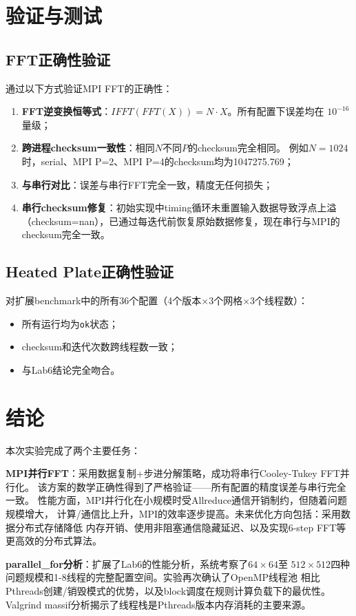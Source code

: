 \documentclass[UTF8,a4paper,12pt,fontset=none]{ctexart}
\begin{document}
\section{验证与测试}

\subsection{FFT正确性验证}

通过以下方式验证MPI FFT的正确性：

\begin{enumerate}[leftmargin=2.2em]
  \item \textbf{FFT逆变换恒等式}：$IFFT(FFT(X)) = N \cdot X$。所有配置下误差均在
    $10^{-16}$量级；
  \item \textbf{跨进程checksum一致性}：相同$N$不同$P$的checksum完全相同。
    例如$N=1024$时，serial、MPI P=2、MPI P=4的checksum均为1047275.769；
  \item \textbf{与串行对比}：误差与串行FFT完全一致，精度无任何损失；
  \item \textbf{串行checksum修复}：初始实现中timing循环未重置输入数据导致浮点上溢
    （checksum=nan），已通过每迭代前恢复原始数据修复，现在串行与MPI的checksum完全一致。
\end{enumerate}

\subsection{Heated Plate正确性验证}

对扩展benchmark中的所有36个配置（4个版本×3个网格×3个线程数）：
\begin{itemize}[leftmargin=2.2em]
  \item 所有运行均为\texttt{ok}状态；
  \item checksum和迭代次数跨线程数一致；
  \item 与Lab6结论完全吻合。
\end{itemize}

\section{结论}

本次实验完成了两个主要任务：

\textbf{MPI并行FFT}：采用数据复制+步进分解策略，成功将串行Cooley-Tukey FFT并行化。
该方案的数学正确性得到了严格验证——所有配置的精度误差与串行完全一致。
性能方面，MPI并行化在小规模时受Allreduce通信开销制约，但随着问题规模增大，
计算/通信比上升，MPI的效率逐步提高。未来优化方向包括：采用数据分布式存储降低
内存开销、使用非阻塞通信隐藏延迟、以及实现6-step FFT等更高效的分布式算法。

\textbf{parallel\_for分析}：扩展了Lab6的性能分析，系统考察了$64\times64$至
$512\times512$四种问题规模和1-8线程的完整配置空间。实验再次确认了OpenMP线程池
相比Pthreads创建/销毁模式的优势，以及block调度在规则计算负载下的最优性。
Valgrind massif分析揭示了线程栈是Pthreads版本内存消耗的主要来源。
\end{document}
